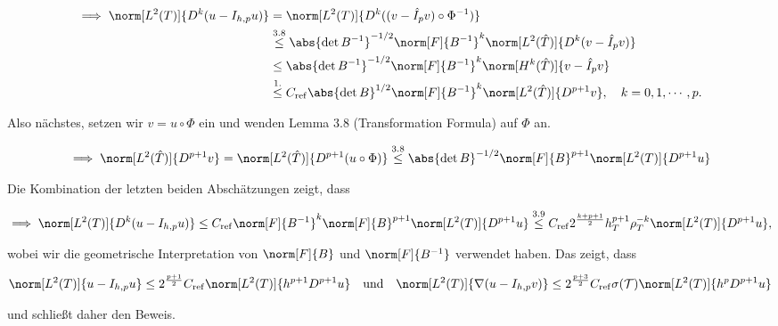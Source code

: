 \begin{solution}
\begin{enumerate}[label = \textbf{\alph*)}]
\begin{enumerate}[label = \arabic*.]
      \begin{align*}
        \implies
        \norm[L^2(T)]{D^k (u - I_{h, p} u)}
        & =
        \norm[L^2(T)]{D^k ((v - \hat I_p v) \circ \Phi^{-1})} \\
        & \stackrel
        {
          \mathrm{3.8}
        }{\leq}
        \abs{\det B^{-1}}^{-1/2} \norm[F]{B^{-1}}^k \norm[L^2(\hat T)]{D^k (v - \hat I_p v)} \\
        & \leq
        \abs{\det B^{-1}}^{-1/2} \norm[F]{B^{-1}}^k \norm[H^k(\hat T)]{v - \hat I_p v} \\
        & \stackrel
        {
          \mathrm{1.}
        }{\leq}
        C_\mathrm{ref} \abs{\det B}^{1/2} \norm[F]{B^{-1}}^k \norm[L^2(\hat T)]{D^{p+1} v},
        \quad
        k = 0, 1, \cdots, p.
      \end{align*}

      Also nächstes, setzen wir $v = u \circ \Phi$ ein und wenden Lemma 3.8 (Transformation Formula) auf $\Phi$ an.

      \begin{align*}
        \implies
        \norm[L^2(\hat T)]{D^{p+1} v}
        =
        \norm[L^2(\hat T)]{D^{p+1} (u \circ \Phi)}
        \stackrel
        {
          \mathrm{3.8}
        }{\leq}
        \abs{\det B}^{-1/2} \norm[F]{B}^{p+1} \norm[L^2(T)]{D^{p+1} u}
      \end{align*}

      Die Kombination der letzten beiden Abschätzungen zeigt, dass

      \begin{align*}
        \implies
        \norm[L^2(T)]{D^k (u - I_{h, p} u)}
        \leq
        C_\mathrm{ref} \norm[F]{B^{-1}}^k \norm[F]{B}^{p+1} \norm[L^2(T)]{D^{p+1} u}
        \stackrel
        {
          \mathrm{3.9}
        }{\leq}
        C_\mathrm{ref} 2^\frac{k+p+1}{2} h_T^{p+1} \rho_T^{-k} \norm[L^2(T)]{D^{p+1} u},
      \end{align*}

      wobei wir die geometrische Interpretation von $\norm[F]{B}$ und $\norm[F]{B^{-1}}$ verwendet haben.
      Das zeigt, dass

      \begin{align*}
        \norm[L^2(T)]{u - I_{h, p} u}
        \leq
        2^{\frac{p+1}{2}} C_\mathrm{ref} \norm[L^2(T)]{h^{p+1} D^{p+1} u}
        \quad
        \text{und}
        \quad
        \norm[L^2(T)]{\nabla (u - I_{h, p} v)}
        \leq 2^{\frac{p+3}{2}} C_\mathrm{ref} \sigma(\mathcal{T}) \norm[L^2(T)]{h^p D^{p+1} u}
      \end{align*}

      und schließt daher den Beweis.

    \end{enumerate}

  \end{enumerate}

  \end{solution}

